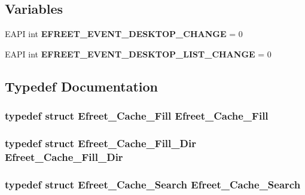 \subsection*{Variables}
\begin{CompactItemize}
\item 
EAPI int {\bf EFREET\_\-EVENT\_\-DESKTOP\_\-CHANGE} = 0
\item 
EAPI int {\bf EFREET\_\-EVENT\_\-DESKTOP\_\-LIST\_\-CHANGE} = 0
\end{CompactItemize}


\subsection{Typedef Documentation}
\subsubsection[Efreet\_\-Cache\_\-Fill]{\setlength{\rightskip}{0pt plus 5cm}typedef struct {\bf Efreet\_\-Cache\_\-Fill} {\bf Efreet\_\-Cache\_\-Fill}}\label{efreet__utils_8c_55b2dd02f36e74803ae332d629b11871}


\subsubsection[Efreet\_\-Cache\_\-Fill\_\-Dir]{\setlength{\rightskip}{0pt plus 5cm}typedef struct {\bf Efreet\_\-Cache\_\-Fill\_\-Dir} {\bf Efreet\_\-Cache\_\-Fill\_\-Dir}}\label{efreet__utils_8c_4bcb5c9400e08d524e37975e3d8b13ce}


\subsubsection[Efreet\_\-Cache\_\-Search]{\setlength{\rightskip}{0pt plus 5cm}typedef struct {\bf Efreet\_\-Cache\_\-Search} {\bf Efreet\_\-Cache\_\-Search}}\label{efreet__utils_8c_822796875c930b144dd1fa02d9091d41}



